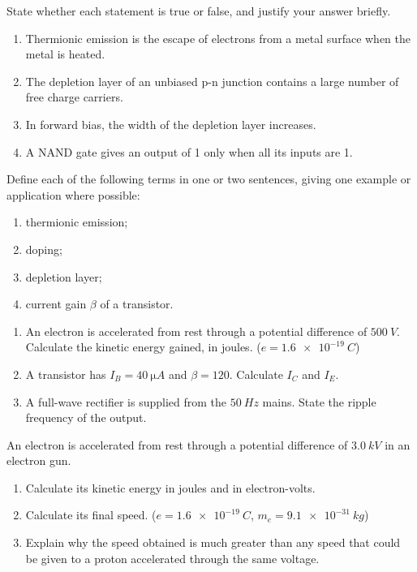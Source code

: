 \documentclass[11pt]{article}
\newcounter{popsec}
\newcounter{popsub}
\newcommand{\courssub}[1]{%
  \stepcounter{popsub}%
  \par\vspace{9pt}\noindent{\popxbold\fontsize{11.5}{13}\selectfont\color{popink}{\color{poporange}\thepopsec.\thepopsub}\hspace{6pt}#1}\par\nopagebreak\vspace{4pt}
}
\begin{document}
\begin{exercice}
State whether each statement is true or false, and justify your answer briefly.
\begin{enumerate}
\item Thermionic emission is the escape of electrons from a metal surface when the metal is heated.
\item The depletion layer of an unbiased p-n junction contains a large number of free charge carriers.
\item In forward bias, the width of the depletion layer increases.
\item A NAND gate gives an output of 1 only when all its inputs are 1.
\end{enumerate}
\end{exercice}

\begin{exercice}[Definitions]
Define each of the following terms in one or two sentences, giving one example or application where possible:
\begin{enumerate}
\item thermionic emission;
\item doping;
\item depletion layer;
\item current gain $\beta$ of a transistor.
\end{enumerate}
\end{exercice}

\begin{exercice}
\begin{enumerate}
\item An electron is accelerated from rest through a potential difference of $\SI{500}{V}$. Calculate the kinetic energy gained, in joules. ($e = \SI{1.6e-19}{C}$)
\item A transistor has $I_B = \SI{40}{\micro A}$ and $\beta = 120$. Calculate $I_C$ and $I_E$.
\item A full-wave rectifier is supplied from the $\SI{50}{Hz}$ mains. State the ripple frequency of the output.
\end{enumerate}
\end{exercice}

\courssub{I practise}

\begin{exercice}
An electron is accelerated from rest through a potential difference of $\SI{3.0}{kV}$ in an electron gun.
\begin{enumerate}
\item Calculate its kinetic energy in joules and in electron-volts.
\item Calculate its final speed. ($e = \SI{1.6e-19}{C}$, $m_e = \SI{9.1e-31}{kg}$)
\item Explain why the speed obtained is much greater than any speed that could be given to a proton accelerated through the same voltage.
\end{enumerate}
\end{exercice}
\end{document}
